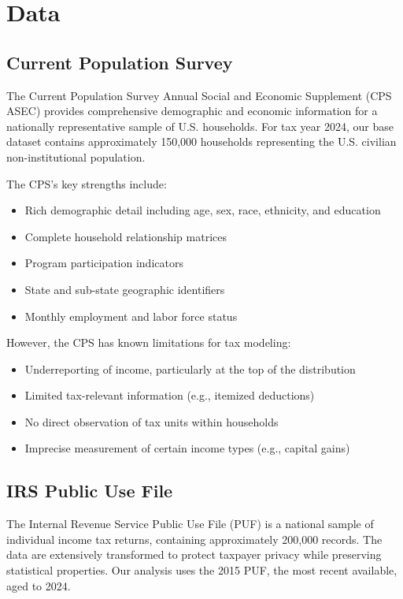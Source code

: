 \section{Data}\label{sec:data}


\subsection{Current Population Survey}

The Current Population Survey Annual Social and Economic Supplement (CPS ASEC) provides comprehensive demographic and economic information for a nationally representative sample of U.S. households. For tax year 2024, our base dataset contains approximately 150,000 households representing the U.S. civilian non-institutional population.

The CPS's key strengths include:
\begin{itemize}
    \item Rich demographic detail including age, sex, race, ethnicity, and education
    \item Complete household relationship matrices
    \item Program participation indicators
    \item State and sub-state geographic identifiers
    \item Monthly employment and labor force status
\end{itemize}

However, the CPS has known limitations for tax modeling:
\begin{itemize}
    \item Underreporting of income, particularly at the top of the distribution
    \item Limited tax-relevant information (e.g., itemized deductions)
    \item No direct observation of tax units within households
    \item Imprecise measurement of certain income types (e.g., capital gains)
\end{itemize}

\subsection{IRS Public Use File}

The Internal Revenue Service Public Use File (PUF) is a national sample of individual income tax returns, containing approximately 200,000 records. The data are extensively transformed to protect taxpayer privacy while preserving statistical properties. Our analysis uses the 2015 PUF, the most recent available, aged to 2024.


